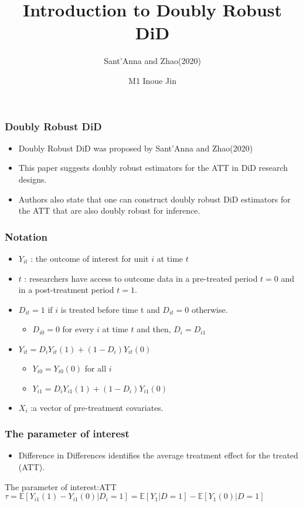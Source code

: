 \documentclass{beamer}
\title{Introduction to Doubly Robust DiD}
\subtitle{Sant'Anna and Zhao(2020)}
\author{M1 Inoue Jin}
\institute{Hitotsubashi University}
\begin{document}

\begin{frame}
    \titlepage
\end{frame}

\begin{frame}\frametitle{Doubly Robust DiD}
    \begin{itemize}
        \item Doubly Robust DiD was proposed by Sant'Anna and Zhao(2020)
        \item This paper suggests doubly robust estimators for the ATT in DiD research designs.
        \item Authors also state that one can construct doubly robust DiD estimators for the ATT that are also doubly robust for inference.
    \end{itemize}
\end{frame}

\begin{frame}\frametitle{Notation}
    \begin{itemize}
        \item $Y_{it}$ : the outcome of interest for unit $i$ at time $t$
        \item $t$ : researchers have access to outcome data in a pre-treated period $t = 0$ and in a post-treatment period $t = 1$.
        \item $D_{it} = 1$ if $i$ is treated before time t and $D_{it} = 0$ otherwise.
        \begin{itemize}
            \item $D_{i0} = 0$ for every $i$ at time $t$ and then, $D_{i} = D_{i1}$
        \end{itemize}
        \item $Y_{it} = D_{i}Y_{it}(1) + (1 - D_{i})Y_{it}(0)$
        \begin{itemize}
            \item $Y_{i0} = Y_{i0}(0)$ for all $i$ 
            \item $Y_{i1} = D_{i}Y_{i1}(1) + (1 - D_{i})Y_{i1}(0)$
        \end{itemize}
        \item $X_{i}$ :a vector of pre-treatment covariates.
    \end{itemize}
\end{frame}

\begin{frame}\frametitle{The parameter of interest}
    \begin{itemize}
        \item Difference in Differences identifies the average treatment effect for the treated (ATT). 
    \end{itemize}
    \begin{block}{The parameter of interest:ATT}
        $\tau = \mathbb{E}[Y_{i1}(1) - Y_{i1}(0)| D_{i} = 1] = \mathbb{E}[Y_{1} |D = 1] - \mathbb{E}[Y_{1}(0) | D = 1]$
    \end{block}
\end{frame}
\end{document}
